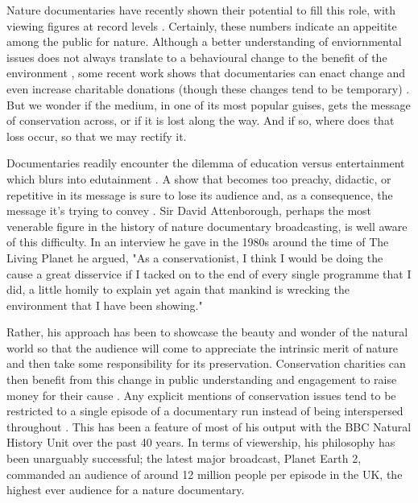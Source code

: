 \documentclass[12pt,letterpaper]{article}
\begin{document}
Nature documentaries have recently shown their potential to fill this role, with viewing figures at record levels \cite{wunder2013taxing,janpol2016does}. Certainly, these numbers indicate an appeitite among the public for nature. Although a better understanding of enviornmental issues does not always translate to a behavioural change to the benefit of the environment \cite{hungerford1990changing,kollmuss2002mind}, some recent work shows that documentaries can enact change and even increase charitable donations (though these changes tend to be temporary) \cite{janpol2016does,jacobsen2011gore}. But we wonder if the medium, in one of its most popular guises, gets the message of conservation across, or if it is lost along the way. And if so, where does that loss occur, so that we may rectify it.

Documentaries readily encounter the dilemma of education versus entertainment which blurs into edutainment \cite{bagust2008screen}. A show that becomes too preachy, didactic, or repetitive in its message is sure to lose its audience and, as a consequence, the message it's trying to convey \cite{janpol2016does}. Sir David Attenborough, perhaps the most venerable figure in the history of nature documentary broadcasting, is well aware of this difficulty. In an interview he gave in the 1980s \cite{burgess1984exploring} around the time of The Living Planet he argued, "As a conservationist, I think I would be doing the cause a great disservice if I tacked on to the end of every single programme that I did, a little homily to explain yet again that mankind is wrecking the environment that I have been showing." 

Rather, his approach has been to showcase the beauty and wonder of the natural world so that the audience will come to appreciate the intrinsic merit of nature and then take some responsibility for its preservation. Conservation charities can then benefit from this change in public understanding and engagement to raise money for their cause \cite{burgess1984exploring}. Any explicit mentions of conservation issues tend to be restricted to a single episode of a documentary run instead of being interspersed throughout \cite{richards2013greening}. This has been a feature of most of his output with the BBC Natural History Unit over the past 40 years. In terms of viewership, his philosophy has been unarguably successful; the latest major broadcast, Planet Earth 2, commanded an audience of around 12 million people per episode in the UK, the highest ever audience for a nature documentary. 
\end{document}
